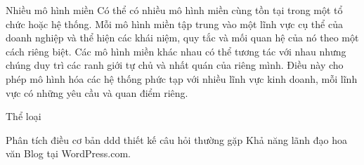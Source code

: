 Nhiều mô hình miền
Có thể có nhiều mô hình miền cùng tồn tại trong một tổ chức hoặc hệ thống. Mỗi mô hình miền tập trung vào một lĩnh vực cụ thể của doanh nghiệp và thể hiện các khái niệm, quy tắc và mối quan hệ của nó theo một cách riêng biệt. Các mô hình miền khác nhau có thể tương tác với nhau nhưng chúng duy trì các ranh giới tự chủ và nhất quán của riêng mình. Điều này cho phép mô hình hóa các hệ thống phức tạp với nhiều lĩnh vực kinh doanh, mỗi lĩnh vực có những yêu cầu và quan điểm riêng.


Thể loại

Phân tích
điều cơ bản
ddd
thiết kế
câu hỏi thường gặp
Khả năng lãnh đạo
hoa văn
Blog tại WordPress.com.
